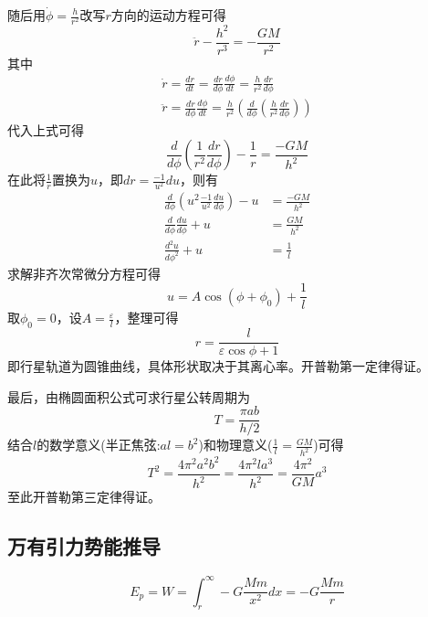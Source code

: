 随后用$\dot{\phi}=\frac{h}{r^2}$改写$r$方向的运动方程可得
\begin{equation*}
    \ddot{r}-\frac{h^2}{r^3}=-\frac{GM}{r^2}
\end{equation*}
其中
\begin{gather*}
    \dot{r}=\frac{dr}{dt}=\frac{dr}{d\phi}\frac{d\phi}{dt}=\frac{h}{r^2}\frac{dr}{d\phi}\\
    \ddot{r}=\frac{d\dot{r}}{d\phi}\frac{d\phi}{dt}=\frac{h}{r^2}\left(\frac{d}{d\phi}\left(\frac{h}{r^2}\frac{dr}{d\phi}\right)\right)
\end{gather*}
代入上式可得
\begin{equation*}
    \frac{d}{d\phi}\left(\frac{1}{r^2}\frac{dr}{d\phi}\right)-\frac1r=\frac{-GM}{h^2}
\end{equation*}
在此将$\frac1r$置换为$u$，即$dr=\frac{-1}{u^2}du$，则有
\begin{align*}
    \frac{d}{d\phi}\left(u^2\frac{-1}{u^2}\frac{du}{d\phi}\right)-u&=\frac{-GM}{h^2}\\
    \frac{d}{d\phi}\frac{du}{d\phi}+u&=\frac{GM}{h^2}\\
    \frac{d^2u}{d\phi^2}+u&=\frac1l
\end{align*}
求解非齐次常微分方程可得
\begin{equation*}
    u=A\cos(\phi+\phi_0)+\frac1l
\end{equation*}
取$\phi_0=0$，设$A=\frac{\varepsilon}{l}$，整理可得
\begin{equation*}
    r=\frac{l}{\varepsilon\cos\phi+1}
\end{equation*}
即行星轨道为圆锥曲线，具体形状取决于其离心率。开普勒第一定律得证。

最后，由椭圆面积公式可求行星公转周期为
\begin{equation*}
    T=\frac{\pi ab}{h/2}
\end{equation*}
结合$l$的数学意义(半正焦弦:$al=b^2$)和物理意义($\frac1l=\frac{GM}{h^2}$)可得
\begin{equation*}
    T^2=\frac{4\pi^2 a^2b^2}{h^2}
    =\frac{4\pi^2la^3}{h^2}
    =\frac{4\pi^2}{GM}a^3
\end{equation*}
至此开普勒第三定律得证。

\subsection{万有引力势能推导}

\begin{equation*}
    E_p=W=\int_r^\infty-G\frac{Mm}{x^2}dx=-G\frac{Mm}{r}
\end{equation*}
